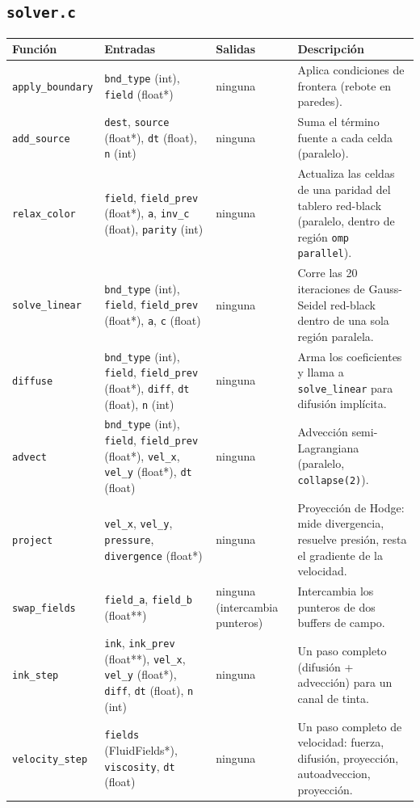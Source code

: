 \documentclass[11pt]{article}
\begin{document}
\subsection*{\texttt{solver.c}}
\begin{longtable}{L{4cm}L{4.1cm}L{2.2cm}L{3.7cm}}
\toprule
Función & Entradas & Salidas & Descripción \\
\midrule
\texttt{apply\_boundary} & \texttt{bnd\_type} (int), \texttt{field} (float*) & ninguna & Aplica condiciones de frontera (rebote en paredes). \\
\texttt{add\_source} & \texttt{dest}, \texttt{source} (float*), \texttt{dt} (float), \texttt{n} (int) & ninguna & Suma el término fuente a cada celda (paralelo). \\
\texttt{relax\_color} & \texttt{field}, \texttt{field\_prev} (float*), \texttt{a}, \texttt{inv\_c} (float), \texttt{parity} (int) & ninguna & Actualiza las celdas de una paridad del tablero red-black (paralelo, dentro de región \texttt{omp parallel}). \\
\texttt{solve\_linear} & \texttt{bnd\_type} (int), \texttt{field}, \texttt{field\_prev} (float*), \texttt{a}, \texttt{c} (float) & ninguna & Corre las 20 iteraciones de Gauss-Seidel red-black dentro de una sola región paralela. \\
\texttt{diffuse} & \texttt{bnd\_type} (int), \texttt{field}, \texttt{field\_prev} (float*), \texttt{diff}, \texttt{dt} (float), \texttt{n} (int) & ninguna & Arma los coeficientes y llama a \texttt{solve\_linear} para difusión implícita. \\
\texttt{advect} & \texttt{bnd\_type} (int), \texttt{field}, \texttt{field\_prev} (float*), \texttt{vel\_x}, \texttt{vel\_y} (float*), \texttt{dt} (float) & ninguna & Advección semi-Lagrangiana (paralelo, \texttt{collapse(2)}). \\
\texttt{project} & \texttt{vel\_x}, \texttt{vel\_y}, \texttt{pressure}, \texttt{divergence} (float*) & ninguna & Proyección de Hodge: mide divergencia, resuelve presión, resta el gradiente de la velocidad. \\
\texttt{swap\_fields} & \texttt{field\_a}, \texttt{field\_b} (float**) & ninguna (intercambia punteros) & Intercambia los punteros de dos buffers de campo. \\
\texttt{ink\_step} & \texttt{ink}, \texttt{ink\_prev} (float**), \texttt{vel\_x}, \texttt{vel\_y} (float*), \texttt{diff}, \texttt{dt} (float), \texttt{n} (int) & ninguna & Un paso completo (difusión + advección) para un canal de tinta. \\
\texttt{velocity\_step} & \texttt{fields} (FluidFields*), \texttt{viscosity}, \texttt{dt} (float) & ninguna & Un paso completo de velocidad: fuerza, difusión, proyección, autoadveccion, proyección. \\
\bottomrule
\end{longtable}
\end{document}
